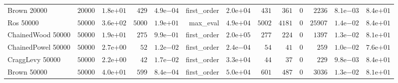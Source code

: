 \begin{longtable}[c]{lrrrrrrrrrrrr}
Brown 20000 & \(20000\) & \( 1.8\)e\(+01\) & \(  429\) & \( 4.9\)e\(-04\) & first\_order & \( 2.0\)e\(+04\) & \(  431\) & \(  361\) & \(    0\) & \( 2236\) & \( 8.1\)e\(-03\) & \( 8.4\)e\(+01\) \\
Ros 50000 & \(50000\) & \( 3.6\)e\(+02\) & \( 5000\) & \( 1.9\)e\(+01\) & max\_eval & \( 4.9\)e\(+04\) & \( 5002\) & \( 4181\) & \(    0\) & \(25907\) & \( 1.4\)e\(-02\) & \( 8.4\)e\(+01\) \\
ChainedWood 50000 & \(50000\) & \( 1.9\)e\(+01\) & \(  275\) & \( 9.9\)e\(-01\) & first\_order & \( 2.0\)e\(+05\) & \(  277\) & \(  224\) & \(    0\) & \( 1397\) & \( 1.3\)e\(-02\) & \( 8.1\)e\(+01\) \\
ChainedPowel 50000 & \(50000\) & \( 2.7\)e\(+00\) & \(   52\) & \( 1.2\)e\(-02\) & first\_order & \( 2.4\)e\(-04\) & \(   54\) & \(   41\) & \(    0\) & \(  259\) & \( 1.0\)e\(-02\) & \( 7.6\)e\(+01\) \\
CraggLevy 50000 & \(50000\) & \( 2.2\)e\(+00\) & \(   42\) & \( 1.7\)e\(-02\) & first\_order & \( 3.3\)e\(+04\) & \(   44\) & \(   37\) & \(    0\) & \(  229\) & \( 9.8\)e\(-03\) & \( 8.4\)e\(+01\) \\
Brown 50000 & \(50000\) & \( 4.0\)e\(+01\) & \(  599\) & \( 8.4\)e\(-04\) & first\_order & \( 5.0\)e\(+04\) & \(  601\) & \(  487\) & \(    0\) & \( 3036\) & \( 1.3\)e\(-02\) & \( 8.1\)e\(+01\) \\
\hline 
\end{longtable}



